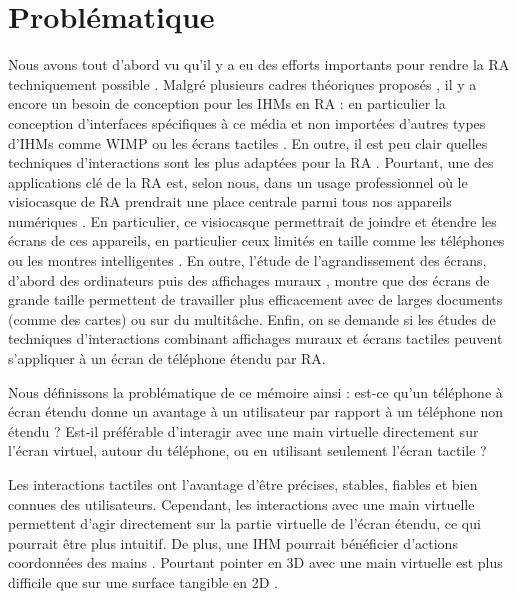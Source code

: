 \section{Problématique}
\label{sec:research_problem}

Nous avons tout d'abord vu qu'il y a eu des efforts importants pour rendre la RA techniquement possible \citep{Azuma2001, VanKrevelen2010}. Malgré plusieurs cadres théoriques proposés \citep{Milgram1994, Rekimoto1995, Bimber2005, Ens2014a}, il y a encore un besoin de conception pour les IHMs en RA \citep{Billinghurst2015} : en particulier la conception d'interfaces spécifiques à ce média et non importées d'autres types d'IHMs comme WIMP ou les écrans tactiles \citep{VanDam1997, Billinghurst2005}. En outre, il est peu clair quelles techniques d'interactions sont les plus adaptées pour la RA \citep{Argelaguet2013, Piumsomboon2013, Piumsomboon2014}. Pourtant, une des applications clé de la RA est, selon nous, dans un usage professionnel où le visiocasque de RA prendrait une place centrale parmi tous nos appareils numériques \citep{Rekimoto1995, Serrano2015}. En particulier, ce visiocasque permettrait de joindre et étendre les écrans de ces appareils, en particulier ceux limités en taille comme les téléphones ou les montres intelligentes \cite{Grubert2015}. En outre, l'étude de l'agrandissement des écrans, d'abord des ordinateurs \cite{Baudisch2002, Guiard2004} puis des affichages muraux \cite{Liu2014, Raedle2014}, montre que des écrans de grande taille permettent de travailler plus efficacement avec de larges documents (comme des cartes) ou sur du multitâche. Enfin, on se demande si les études de techniques d'interactions combinant affichages muraux et écrans tactiles \cite{Nancel2011, Berge2014} peuvent s'appliquer à un écran de téléphone étendu par RA.

Nous définissons la problématique de ce mémoire ainsi : est-ce qu'un téléphone à écran étendu donne un avantage à un utilisateur par rapport à un téléphone non étendu ? Est-il préférable d'interagir avec une main virtuelle directement sur l'écran virtuel, autour du téléphone, ou en utilisant seulement l'écran tactile ?

Les interactions tactiles ont l'avantage d'être précises, stables, fiables et bien connues des utilisateurs. Cependant, les interactions avec une main virtuelle permettent d'agir directement sur la partie virtuelle de l'écran étendu, ce qui pourrait être plus intuitif. De plus, une IHM pourrait bénéficier d'actions coordonnées des mains \citep{White2009}. Pourtant pointer en 3D avec une main virtuelle est plus difficile que sur une surface tangible en 2D \citep{Argelaguet2013}.


